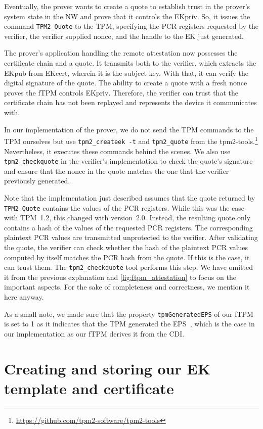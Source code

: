 Eventually, the prover wants to create a quote to establish trust in the prover's system state in the \ac{NW} and prove that it controls the EKpriv.
So, it issues the command \texttt{TPM2\_Quote} to the TPM, specifying the PCR registers requested by the verifier, the verifier supplied nonce, and the handle to the EK just generated.

The prover's application handling the remote attestation now possesses the certificate chain and a quote.
It transmits both to the verifier, which extracts the EKpub from EKcert, wherein it is the subject key.
With that, it can verify the digital signature of the quote.
The ability to create a quote with a fresh nonce proves the fTPM controls EKpriv.
Therefore, the verifier can trust that the certificate chain has not been replayed and represents the device it communicates with.

In our implementation of the prover, we do not send the TPM commands to the TPM ourselves but use \texttt{tpm2\_createek~-t} and \texttt{tpm2\_quote} from the tpm2-tools.\footnote{\url{https://github.com/tpm2-software/tpm2-tools}}
Nevertheless, it executes these commands behind the scenes.
We also use \texttt{tpm2\_checkquote} in the verifier's implementation to check the quote's signature and ensure that the nonce in the quote matches the one that the verifier previously generated.

Note that the implementation just described assumes that the quote returned by \texttt{TPM2\_Quote} contains the values of the PCR registers.
While this was the case with TPM~1.2, this changed with version~2.0.
Instead, the resulting quote only contains a hash of the values of the requested PCR registers.
The corresponding plaintext PCR values are transmitted unprotected to the verifier.
After validating the quote, the verifier can check whether the hash of the plaintext PCR values computed by itself matches the PCR hash from the quote.
If this is the case, it can trust them.
The \texttt{tpm2\_checkquote} tool performs this step.
We have omitted it from the previous explanation and \autoref{fig:ftpm_attestation} to focus on the important aspects.
For the sake of completeness and correctness, we mention it here anyway.

As a small note, we made sure that the property \texttt{tpmGeneratedEPS} of our fTPM is set to 1 as it indicates that the TPM generated the EPS~\cite{tpm20}, which is the case in our implementation as our \ac{fTPM} derives it from the CDI\@.


\section{Creating and storing our EK template and certificate}

